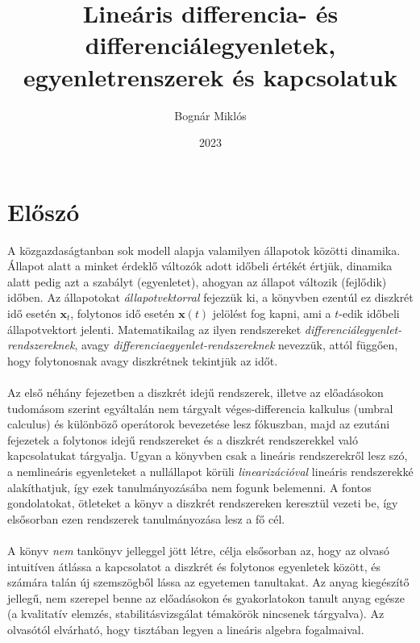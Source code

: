 \documentclass[14p]{article}
\title{\Huge{Lineáris} differencia- és differenciálegyenletek, egyenletrenszerek és kapcsolatuk}
\date{2023}
\author{Bognár Miklós}
\begin{document}
\maketitle
\pagestyle{fancy}
\fancyhead[RO,LE]{}

\overfullrule=0mm
\tableofcontents
\pagebreak

\section{Előszó}
A közgazdaságtanban sok modell alapja valamilyen állapotok közötti dinamika. Állapot alatt a minket érdeklő változók adott időbeli értékét értjük, dinamika alatt pedig azt a szabályt (egyenletet), ahogyan az állapot változik (fejlődik) időben. Az állapotokat \emph{állapotvektorral} fejezzük ki, a könyvben ezentúl ez diszkrét idő esetén $\pmb{x}_t$, folytonos idő esetén $\pmb{x}(t)$ jelölést fog kapni, ami a $t$-edik időbeli állapotvektort jelenti. Matematikailag az ilyen rendszereket \emph{differenciálegyenlet-rendszereknek}, avagy \emph{differenciaegyenlet-rendszereknek} nevezzük, attól függően, hogy folytonosnak avagy diszkrétnek tekintjük az időt.
\\
\\
Az első néhány fejezetben a diszkrét idejű rendszerek, illetve az előadásokon tudomásom szerint egyáltalán nem tárgyalt véges-differencia kalkulus (umbral calculus) és különböző operátorok bevezetése lesz fókuszban, majd az ezutáni fejezetek a folytonos idejű rendszereket és a diszkrét rendszerekkel való kapcsolatukat tárgyalja. Ugyan a könyvben csak a lineáris rendszerekről lesz szó, a nemlineáris egyenleteket a nullállapot körüli \emph{linearizációval} lineáris rendszerekké alakíthatjuk, így ezek tanulmányozásába nem fogunk belemenni. A fontos gondolatokat, ötleteket a könyv a diszkrét rendszereken keresztül vezeti be, így elsősorban ezen rendszerek tanulmányozása lesz a fő cél. 
\\
\\
A könyv \emph{nem} tankönyv jelleggel jött létre, célja elsősorban az, hogy az olvasó intuitíven átlássa a kapcsolatot a diszkrét és folytonos egyenletek között, és számára talán új szemszögből lássa az egyetemen tanultakat. Az anyag kiegészítő jellegű, nem szerepel benne az előadásokon és gyakorlatokon tanult anyag egésze (a kvalitatív elemzés, stabilitásvizsgálat témakörök nincsenek tárgyalva). Az olvasótól elvárható, hogy tisztában legyen a lineáris algebra fogalmaival.  

\pagebreak
\end{document}
